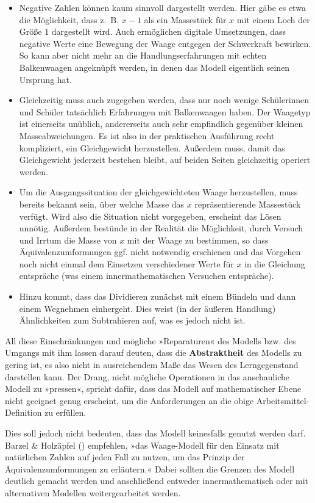 \documentclass[
]{scrbook}
\theoremstyle{definition}
\theoremstyle{definition}
\theoremstyle{definition}
\theoremstyle{definition}
\theoremstyle{remark}
\begin{document}
\begin{itemize}
\item
  Negative Zahlen können kaum sinnvoll dargestellt werden. Hier gäbe es etwa die Möglichkeit, dass z.~B. \(x-1\) als ein Massestück für \(x\) mit einem Loch der Größe \(1\) dargestellt wird. Auch ermöglichen digitale Umsetzungen, dass negative Werte eine Bewegung der Waage entgegen der Schwerkraft bewirken. So kann aber nicht mehr an die Handlungserfahrungen mit echten Balkenwaagen angeknüpft werden, in denen das Modell eigentlich seinen Ursprung hat.
\item
  Gleichzeitig muss auch zugegeben werden, dass nur noch wenige Schülerinnen und Schüler tatsächlich Erfahrungen mit Balkenwaagen haben. Der Waagetyp ist einerseits unüblich, andererseits auch sehr empfindlich gegenüber kleinen Masseabweichungen. Es ist also in der praktischen Ausführung recht kompliziert, ein Gleichgewicht herzustellen. Außerdem muss, damit das Gleichgewicht jederzeit bestehen bleibt, auf beiden Seiten gleichzeitig operiert werden.
\item
  Um die Ausgangssituation der gleichgewichteten Waage herzustellen, muss bereits bekannt sein, über welche Masse das \(x\) repräsentierende Massestück verfügt. Wird also die Situation nicht vorgegeben, erscheint das Lösen unnötig. Außerdem bestünde in der Realität die Möglichkeit, durch Versuch und Irrtum die Masse von \(x\) mit der Waage zu bestimmen, so dass Äquivalenzumformungen ggf. nicht notwendig erschienen und das Vorgehen noch nicht einmal dem Einsetzen verschiedener Werte für \(x\) in die Gleichung entspräche (was einem innermathematischen Versuchen entspräche).
\item
  Hinzu kommt, dass das Dividieren zunächst mit einem Bündeln und dann einem Wegnehmen einhergeht. Dies weist (in der äußeren Handlung) Ähnlichkeiten zum Subtrahieren auf, was es jedoch nicht ist.
\end{itemize}

All diese Einschränkungen und mögliche »Reparaturen« des Modells bzw. des Umgangs mit ihm lassen darauf deuten, dass die \textbf{Abstraktheit} des Modells zu gering ist, es also nicht in ausreichendem Maße das Wesen des Lerngegenstand darstellen kann. Der Drang, nicht mögliche Operationen in das anschauliche Modell zu »pressen«, spricht dafür, dass das Modell auf mathematischer Ebene nicht geeignet genug erscheint, um die Anforderungen an die obige Arbeitsmittel-Definition zu erfüllen.

Dies soll jedoch nicht bedeuten, dass das Modell keinesfalls genutzt werden darf. Barzel \& Holzäpfel () empfehlen, »das Waage-Modell für den Einsatz mit natürlichen Zahlen auf jeden Fall zu nutzen, um das Prinzip der Äquivalenzumformungen zu erläutern.« Dabei sollten die Grenzen des Modell deutlich gemacht werden und anschließend entweder innermathematisch oder mit alternativen Modellen weitergearbeitet werden.
\end{document}
